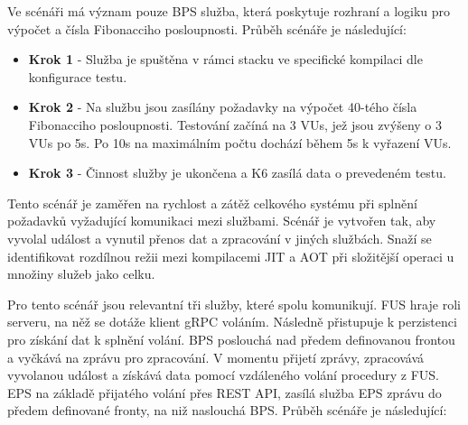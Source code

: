 
Ve scénáři má význam pouze BPS služba, která poskytuje rozhraní a logiku pro výpočet a čísla Fibonacciho posloupnosti. Průběh scénáře je následující:

\begin{itemize}
    \item \textbf{Krok 1} - Služba je spuštěna v rámci stacku ve specifické kompilaci dle konfigurace testu.
    \item \textbf{Krok 2} - Na službu jsou zasílány požadavky na výpočet 40-tého čísla Fibonacciho posloupnosti. Testování začíná na 3 VUs, jež jsou zvýšeny o 3 VUs po 5s. Po 10s na maximálním počtu dochází během 5s k vyřazení VUs.
    \item \textbf{Krok 3} - Činnost služby je ukončena a K6 zasílá data o prevedeném testu.
\end{itemize}


Tento scénář je zaměřen na rychlost a zátěž celkového systému při splnění požadavků vyžadující komunikaci mezi službami. Scénář je vytvořen tak, aby vyvolal událost a vynutil přenos dat a zpracování v jiných službách. Snaží se identifikovat rozdílnou režii mezi kompilacemi JIT a AOT při složitější operaci u množiny služeb jako celku.


Pro tento scénář jsou relevantní tři služby, které spolu komunikují. FUS hraje roli serveru, na něž se dotáže klient gRPC voláním. Následně přistupuje k perzistenci pro získání dat k splnění volání. BPS poslouchá nad předem definovanou frontou a vyčkává na zprávu pro zpracování. V momentu přijetí zprávy, zpracovává vyvolanou událost a získává data pomocí vzdáleného volání procedury z FUS. EPS na základě přijatého volání přes REST API, zasílá služba EPS zprávu do předem definované fronty, na niž naslouchá BPS. Průběh scénáře je následující:


